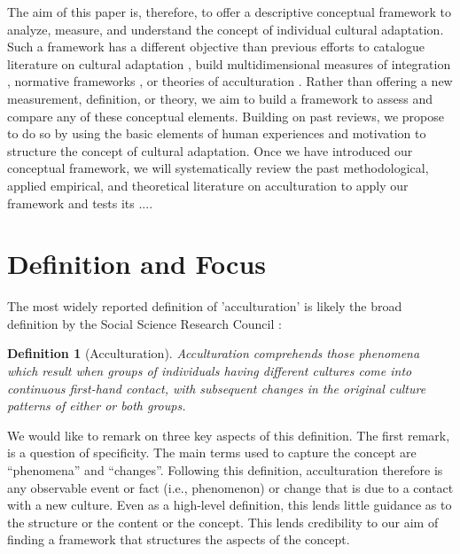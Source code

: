\documentclass[nobib]{tufte-handout}
\newtheorem{definition}{Definition}
\begin{document}
 The aim of this paper is, therefore, to offer a descriptive conceptual framework to analyze, measure, and understand the concept of individual cultural adaptation. Such a framework has a different objective than previous efforts to catalogue literature on cultural adaptation \citep[e.g.,][]{Castels2003}, build multidimensional measures of integration \citep[e.g.,][]{Harder2018}, normative frameworks \citep[e.g.,][]{Ager2008a}, or theories of acculturation \citep[e.g.,][]{Berry2005}. Rather than offering a new measurement, definition, or theory, we aim to build a framework to assess and compare any of these conceptual elements. 
Building on past reviews, we propose to do so by using the basic elements of human experiences and motivation to structure the concept of cultural adaptation.
Once we have introduced our conceptual framework, we will systematically review the past methodological, applied empirical, and theoretical literature on acculturation to apply our framework and tests its ....

\newpage
\section{Definition and Focus}\label{sec:definition}
The most widely reported definition of 'acculturation' is likely the broad definition by the Social Science Research Council \citep[][p. 149]{Redfield1936}:
\begin{definition}[Acculturation]
Acculturation comprehends those phenomena which result when groups of individuals having different cultures come into continuous first-hand contact, with subsequent changes in the original culture patterns of either or both groups. 
\end{definition}
We would like to remark on three key aspects of this definition. The first remark, is a question of specificity. The main terms used to capture the concept are “phenomena” and “changes”. Following this definition, acculturation therefore is any observable event or fact (i.e., phenomenon) or change that is due to a contact with a new culture. Even as a high-level definition, this lends little guidance as to the structure or the content or the concept. This lends credibility to our aim of finding a framework that structures the aspects of the concept.
\end{document}
